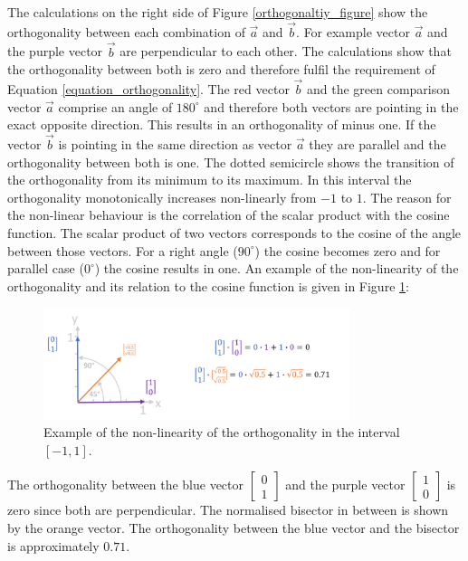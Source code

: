 The calculations on the right side of Figure \ref{orthogonaltiy_figure} show the orthogonality between each combination of $\overrightarrow{a}$ and $\overrightarrow{b}$. For example vector $\overrightarrow{a}$ and the purple vector $\overrightarrow{b}$ are perpendicular to each other. The calculations show that the orthogonality between both is zero and therefore fulfil the requirement of Equation \ref{equation_orthogonality}. The red vector $\overrightarrow{b}$ and the green comparison vector $\overrightarrow{a}$ comprise an angle of $180^{\circ}$ and therefore both vectors are pointing in the exact opposite direction. This results in an orthogonality of minus one.
If the vector $\overrightarrow{b}$ is pointing in the same direction as vector $\overrightarrow{a}$ they are parallel and the orthogonality between both is one. The dotted semicircle shows the transition of the orthogonality from its minimum to its maximum. In this interval the orthogonality monotonically increases non-linearly from $-1$ to $1$. The reason for the non-linear behaviour is the correlation of the scalar product with the cosine function. The scalar product of two vectors corresponds to the cosine of the angle between those vectors. For a right angle ($90^{\circ}$) the cosine becomes zero and for parallel case ($0^{\circ}$) the cosine results in one. An example of the non-linearity of the orthogonality and its relation to the cosine function is given in Figure \ref{orthogonaltiy_figure2}:

\begin{figure}[H]
    \centering
    \includegraphics[width=0.8\textwidth]{Graphics/orthogonality2.png}
    \caption{Example of the non-linearity of the orthogonality in the interval $[-1,1]$. }
    \label{orthogonaltiy_figure2}
\end{figure}

The orthogonality between the blue vector $\begin{bmatrix} 0 \\ 1 \end{bmatrix}$ and the purple vector $\begin{bmatrix} 1 \\ 0 \end{bmatrix}$ is zero since both are perpendicular. The normalised bisector in between is shown by the orange vector.
The orthogonality between the blue vector and the bisector is approximately $0.71$.





